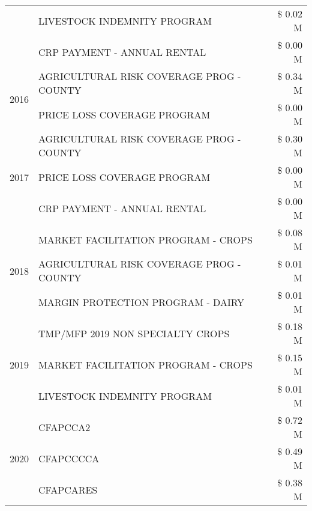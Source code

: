 \begin{tabular}{llr}
 & LIVESTOCK INDEMNITY PROGRAM & \$ 0.02 M \\
 & CRP PAYMENT - ANNUAL RENTAL & \$ 0.00 M \\
\cline{1-3}
\multirow[t]{2}{*}{2016} & AGRICULTURAL RISK COVERAGE PROG - COUNTY & \$ 0.34 M \\
 & PRICE LOSS COVERAGE PROGRAM & \$ 0.00 M \\
\cline{1-3}
\multirow[t]{3}{*}{2017} & AGRICULTURAL RISK COVERAGE PROG - COUNTY & \$ 0.30 M \\
 & PRICE LOSS COVERAGE PROGRAM & \$ 0.00 M \\
 & CRP PAYMENT - ANNUAL RENTAL & \$ 0.00 M \\
\cline{1-3}
\multirow[t]{3}{*}{2018} & MARKET FACILITATION PROGRAM - CROPS & \$ 0.08 M \\
 & AGRICULTURAL RISK COVERAGE PROG - COUNTY & \$ 0.01 M \\
 & MARGIN PROTECTION PROGRAM - DAIRY & \$ 0.01 M \\
\cline{1-3}
\multirow[t]{3}{*}{2019} & TMP/MFP 2019 NON SPECIALTY CROPS & \$ 0.18 M \\
 & MARKET FACILITATION PROGRAM - CROPS & \$ 0.15 M \\
 & LIVESTOCK INDEMNITY PROGRAM & \$ 0.01 M \\
\cline{1-3}
\multirow[t]{3}{*}{2020} & CFAPCCA2 & \$ 0.72 M \\
 & CFAPCCCCA & \$ 0.49 M \\
 & CFAPCARES & \$ 0.38 M \\
\cline{1-3}
\bottomrule
\end{tabular}
